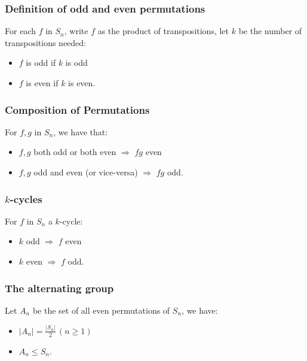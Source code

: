 \documentclass[a4paper, 12pt, twoside]{article}
\begin{document}
\subsubsection{Definition of odd and even permutations}

For each $f$ in $S_n$, write $f$ as the product of transpositions,
let $k$ be the number of transpositions needed:
\begin{itemize}
      \item $f$ is odd if $k$ is odd
      \item $f$ is even if $k$ is even.
\end{itemize}

\subsubsection{Composition of Permutations}

For $f, g$ in $S_n$, we have that:

\begin{itemize}
      \item $f, g$ both odd or both even $\Rightarrow$ $fg$ even
      \item $f, g$ odd and even (or vice-versa)
            $\Rightarrow$ $fg$ odd.
\end{itemize}

\subsubsection{$k$-cycles}

For $f$ in $S_n$ a $k$-cycle:

\begin{itemize}
      \item $k$ odd $\Rightarrow$ $f$ even
      \item $k$ even $\Rightarrow$ $f$ odd.
\end{itemize}

\subsubsection{The alternating group}

Let $A_n$ be the set of all even permutations of $S_n$, we have:

\begin{itemize}
      \item $|A_n| = \frac{|S_n|}{2} \, (n \geq 1)$
      \item $A_n \leq S_n$.
\end{itemize}
\end{document}

